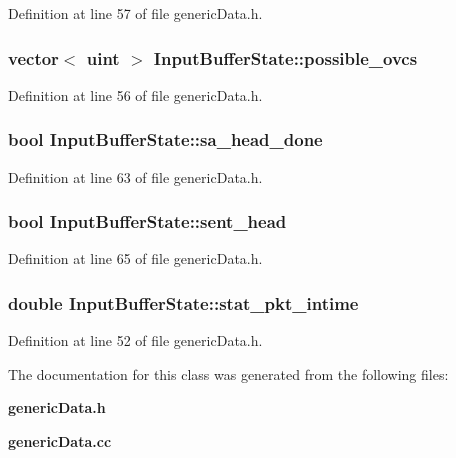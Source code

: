 Definition at line 57 of file genericData.h.
\subsubsection[{possible\_\-ovcs}]{\setlength{\rightskip}{0pt plus 5cm}vector$<$ {\bf uint} $>$ {\bf InputBufferState::possible\_\-ovcs}}\label{classInputBufferState_9f294f3dd775cb490729e737a3ea3ba9}




Definition at line 56 of file genericData.h.
\subsubsection[{sa\_\-head\_\-done}]{\setlength{\rightskip}{0pt plus 5cm}bool {\bf InputBufferState::sa\_\-head\_\-done}}\label{classInputBufferState_b0b0b1d176a64e15955bf7c62f3fb703}




Definition at line 63 of file genericData.h.
\subsubsection[{sent\_\-head}]{\setlength{\rightskip}{0pt plus 5cm}bool {\bf InputBufferState::sent\_\-head}}\label{classInputBufferState_55c6d3198ecaa8be5abc2c6e24171606}




Definition at line 65 of file genericData.h.
\subsubsection[{stat\_\-pkt\_\-intime}]{\setlength{\rightskip}{0pt plus 5cm}double {\bf InputBufferState::stat\_\-pkt\_\-intime}}\label{classInputBufferState_f383582544ac6dc57725d87aa4927e2a}




Definition at line 52 of file genericData.h.

The documentation for this class was generated from the following files:\begin{CompactItemize}
\item 
{\bf genericData.h}\item 
{\bf genericData.cc}\end{CompactItemize}
